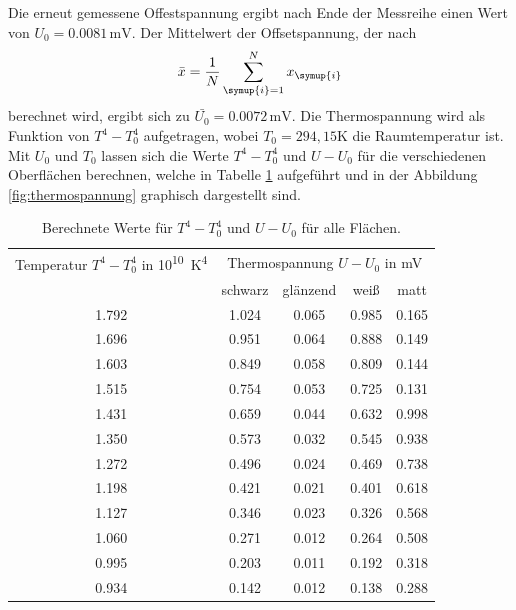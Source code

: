 Die erneut gemessene Offestspannung ergibt nach Ende der Messreihe einen Wert von
$U_0=0.0081 \,\si{\milli\volt}$. Der Mittelwert der Offsetspannung, der nach
\begin{equation}
  \bar{x} = \frac{1}{N} \sum_{\symup{i}=1}^{N} x_\symup{i}
  \label{eqn:mittelwert}
\end{equation}
berechnet wird, ergibt sich zu $\bar{U_0} = 0.0072 \,\si{\milli\volt}$.
Die Thermospannung wird als Funktion von $T^4 - T_0^4$ aufgetragen, wobei $T_0 = 294,15 \si{\kelvin}$
die Raumtemperatur ist.
Mit $U_0$ und $T_0$ lassen sich die Werte $T^4-T_0^4$ und $U-U_0$ für die verschiedenen
Oberflächen berechnen, welche in Tabelle \ref{tab:rechenwerte} aufgeführt und in
der Abbildung \ref{fig:thermospannung} graphisch dargestellt sind.
\begin{table}
  \centering
  \begin{tabular}{c c c c c}
    \toprule
    Temperatur $T^4-T_0^4$ in \si{10^{10}\kelvin^4} & \multicolumn {4}{c}{Thermospannung $U-U_0$ in \si{\milli\volt}}\\
    & schwarz & glänzend & \;weiß & \quad matt \\
    \midrule
     1.792  &  1.024  &  0.065  &  0.985  &  0.165 \\
     1.696  &  0.951  &  0.064  &  0.888  &  0.149 \\
     1.603  &  0.849  &  0.058  &  0.809  &  0.144 \\
     1.515  &  0.754  &  0.053  &  0.725  &  0.131 \\
     1.431  &  0.659  &  0.044  &  0.632  &  0.998 \\
     1.350  &  0.573  &  0.032  &  0.545  &  0.938 \\
     1.272  &  0.496  &  0.024  &  0.469  &  0.738 \\
     1.198  &  0.421  &  0.021  &  0.401  &  0.618 \\
     1.127  &  0.346  &  0.023  &  0.326  &  0.568 \\
     1.060  &  0.271  &  0.012  &  0.264  &  0.508 \\
     0.995  &  0.203  &  0.011  &  0.192  &  0.318 \\
     0.934  &  0.142  &  0.012  &  0.138  &  0.288 \\
    \bottomrule
  \end{tabular}
  \caption{Berechnete Werte für $T^4-T_0^4$ und $U-U_0$ für alle Flächen.}
  \label{tab:rechenwerte}
\end{table}
